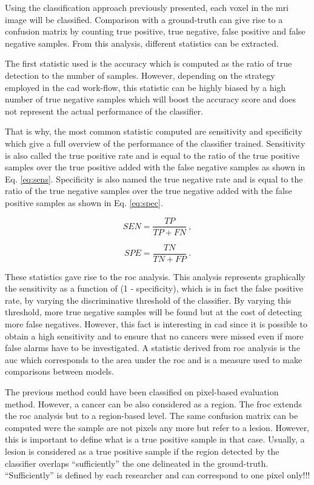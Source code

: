 Using the classification approach previously presented, each voxel in the \ac{mri} image will be classified. Comparison with a ground-truth can give rise to a confusion matrix by counting true positive, true negative, false positive and false negative samples. From this analysis, different statistics can be extracted. 

The first statistic used is the accuracy which is computed as the ratio of true detection to the number of samples. However, depending on the strategy employed in the \ac{cad} work-flow, this statistic can be highly biased by a high number of true negative samples which will boost the accuracy score and does not represent the actual performance of the classifier.

That is why, the most common statistic computed are sensitivity and specificity which give a full overview of the performance of the classifier trained. Sensitivity is also called the true positive rate and is equal to the ratio of the true positive samples over the true positive added with the false negative samples as shown in Eq. \eqref{eq:sens}. Specificity is also named the true negative rate and is equal to the ratio of the true negative samples over the true negative added with the false positive samples as shown in Eq. \eqref{eq:spec}.

\begin{equation}
	SEN = \frac{TP}{TP+FN} \ ,
	\label{eq:sens}
\end{equation}

\begin{equation}
	SPE = \frac{TN}{TN+FP} \ .
	\label{eq:spec}
\end{equation}

These statistics gave rise to the \acf{roc} analysis. This analysis represents graphically the sensitivity as a function of (1 - specificity), which is in fact the false positive rate, by varying the discriminative threshold of the classifier. By varying this threshold, more true negative samples will be found but at the cost of detecting more false negatives. However, this fact is interesting in \ac{cad} since it is possible to obtain a high sensitivity and to ensure that no cancers were missed even if more false alarms have to be investigated. A statistic derived from \ac{roc} analysis is the \acf{auc} which corresponds to the area under the \ac{roc} and is a measure used to make comparisons between models.

The previous method could have been classified on pixel-based evaluation method. However, a cancer can be also considered as a region. The \acf{froc} extends the \ac{roc} analysis but to a region-based level. The same confusion matrix can be computed were the sample are not pixels any more but refer to a lesion. However, this is important to define what is a true positive sample in that case. Usually, a lesion is considered as a true positive sample if the region detected by the classifier overlaps ``sufficiently'' the one delineated in the ground-truth. ``Sufficiently'' is defined by each researcher and can correspond to one pixel only!!!


